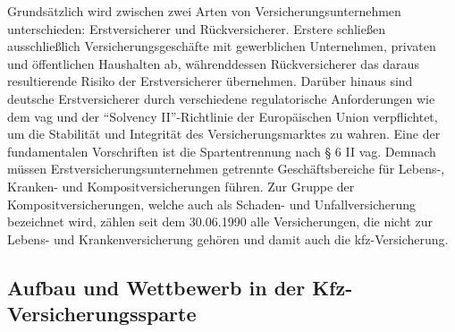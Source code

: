 Grundsätzlich wird zwischen zwei Arten von Versicherungsunternehmen unterschieden: Erstversicherer und Rückversicherer. Erstere schließen ausschließlich Versicherungsgeschäfte mit gewerblichen Unternehmen, privaten und öffentlichen Haushalten ab, währenddessen Rückversicherer das daraus resultierende Risiko der Erstversicherer übernehmen.\autocite[Vgl.][S. 240f.]{FARNY2011} 
Darüber hinaus sind deutsche Erstversicherer durch verschiedene regulatorische Anforderungen wie dem \ac{vag} und der \enquote{Solvency II}-Richtlinie der Europäischen Union verpflichtet, um die Stabilität und Integrität des Versicherungsmarktes zu wahren. \autocite[Vgl.][]{BAFIN2016} Eine der fundamentalen Vorschriften ist die Spartentrennung nach § 6 II \ac{vag}. Demnach müssen Erstversicherungsunternehmen getrennte Geschäftsbereiche für Lebens-, Kranken- und Kompositversicherungen führen. Zur Gruppe der Kompositversicherungen, welche auch als Schaden- und Unfallversicherung bezeichnet wird, zählen seit dem 30.06.1990 alle Versicherungen, die nicht zur Lebens- und Krankenversicherung gehören und damit auch die \ac{kfz}-Versicherung. \autocite[Vgl.][S. 241-243]{FARNY2011} 







\subsection{Aufbau und Wettbewerb in der Kfz-Versicherungssparte}


